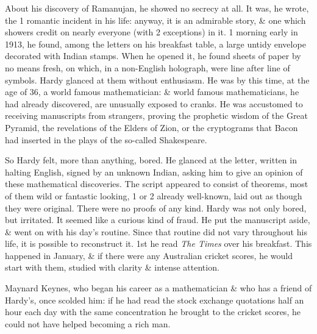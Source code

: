 \documentclass{article}
\numberwithin{equation}{section}
\begin{document}
About his discovery of Ramanujan, he showed no secrecy at all. It was, he wrote, the 1 romantic incident in his life: anyway, it is an admirable story, \& one which showers credit on nearly everyone (with 2 exceptions) in it. 1 morning early in 1913, he found, among the letters on his breakfast table, a large untidy envelope decorated with Indian stamps. When he opened it, he found sheets of paper by no means fresh, on which, in a non-English holograph, were line after line of symbols. Hardy glanced at them without enthusiasm. He was by this time, at the age of 36, a world famous mathematician: \& world famous mathematicians, he had already discovered, are unusually exposed to cranks. He was accustomed to receiving manuscripts from strangers, proving the prophetic wisdom of the Great Pyramid, the revelations of the Elders of Zion, or the cryptograms that Bacon had inserted in the plays of the so-called Shakespeare.

So Hardy felt, more than anything, bored. He glanced at the letter, written in halting English, signed by an unknown Indian, asking him to give an opinion of these mathematical discoveries. The script appeared to consist of theorems, most of them wild or fantastic looking, 1 or 2 already well-known, laid out as though they were original. There were no proofs of any kind. Hardy was not only bored, but irritated. It seemed like a curious kind of fraud. He put the manuscript aside, \& went on with his day's routine. Since that routine did not vary throughout his life, it is possible to reconstruct it. 1st he read \textit{The Times} over his breakfast. This happened in January, \& if there were any Australian cricket scores, he would start with them, studied with clarity \& intense attention.

Maynard Keynes, who began his career as a mathematician \& who has a friend of Hardy's, once scolded him: if he had read the stock exchange quotations half an hour each day with the same concentration he brought to the cricket scores, he could not have helped becoming a rich man.
\end{document}
